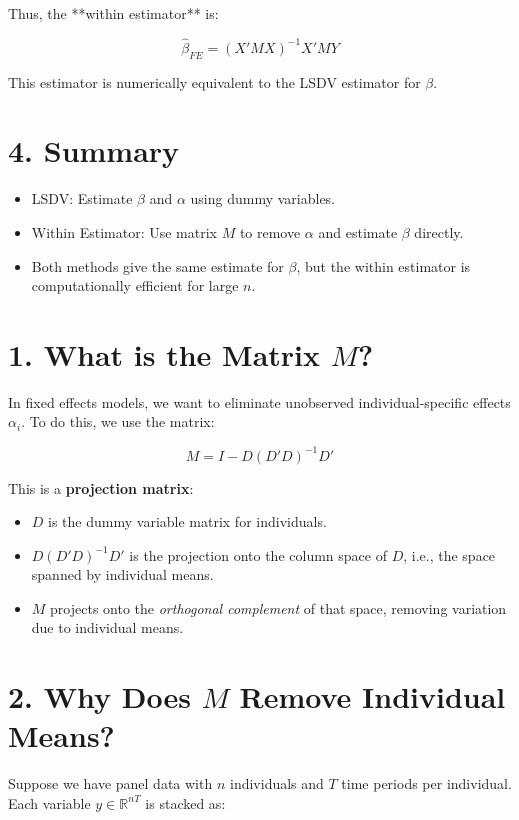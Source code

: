 \documentclass[12pt, oneside]{article}
\begin{document}
Thus, the **within estimator** is:

\[
\hat{\beta}_{FE} = (X'MX)^{-1}X'MY
\]

This estimator is numerically equivalent to the LSDV estimator for \( \beta \).

\section*{4. Summary}

\begin{itemize}
  \item LSDV: Estimate \( \beta \) and \( \alpha \) using dummy variables.
  \item Within Estimator: Use matrix \( M \) to remove \( \alpha \) and estimate \( \beta \) directly.
  \item Both methods give the same estimate for \( \beta \), but the within estimator is computationally efficient for large \( n \).
\end{itemize}

\section*{1. What is the Matrix \( M \)?}

In fixed effects models, we want to eliminate unobserved individual-specific effects \( \alpha_i \). To do this, we use the matrix:

\[
M = I - D(D'D)^{-1}D'
\]

This is a \textbf{projection matrix}:
\begin{itemize}
    \item \( D \) is the dummy variable matrix for individuals.
    \item \( D(D'D)^{-1}D' \) is the projection onto the column space of \( D \), i.e., the space spanned by individual means.
    \item \( M \) projects onto the \textit{orthogonal complement} of that space, removing variation due to individual means.
\end{itemize}

\section*{2. Why Does \( M \) Remove Individual Means?}

Suppose we have panel data with \( n \) individuals and \( T \) time periods per individual. Each variable \( y \in \mathbb{R}^{nT} \) is stacked as:
\end{document}
